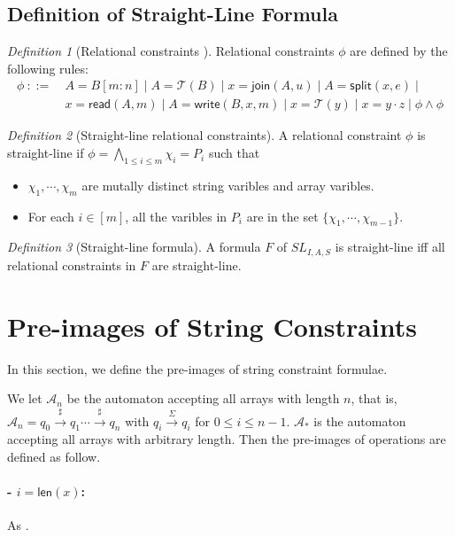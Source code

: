 \documentclass[12pt]{article}
\newcommand*{\aut}{\mathcal{A}}
\newcommand*{\transducer}{\mathcal{T}}
\newcommand{\arrseparator}{\sharp}
\newcommand{\mysplit}{\mathsf{split}}
\newcommand{\myjoin}{\mathsf{join}}
\newcommand{\mylen}{\mathsf{len}}
\newcommand{\myread}{\mathsf{read}}
\newcommand{\mywrite}{\mathsf{write}}
\newcommand{\arraylogic}{SL_{I,A,S}}
\theoremstyle{remark}
\newtheorem{definition}{Definition}[section]
\begin{document}
\subsection{Definition of Straight-Line Formula }
\begin{definition}[Relational constraints ]
    Relational constraints $\phi$ are defined by the following rules:
    \begin{align*}
        \phi \ ::= \  & A = B[m:n] \mid A = \transducer(B) \mid x=\myjoin(A,u) \mid A = \mysplit(x,e) \mid         \\
                      & x=\myread(A, m) \mid A = \mywrite(B, x ,m) \mid x = \transducer(y) \mid x=y\cdot z \mid \phi \wedge \phi 
    \end{align*}
\end{definition}
\begin{definition}[Straight-line relational constraints]
    A relational constraint $\phi$ is straight-line if $\phi = \bigwedge\limits_{1\leq i \leq m} \chi_i = P_i$ such that
    \begin{itemize}
        \item $\chi_1,\cdots,\chi_m $ are mutally distinct string varibles and array varibles.
        \item For each $i\in [m] $, all the varibles in $P_i$ are in the set $\{\chi_1,\cdots,\chi_{m-1} \}$.
    \end{itemize}
\end{definition}
\begin{definition}[Straight-line formula]
    A formula $F$ of $\arraylogic$ is straight-line iff all relational constraints in $F$ are straight-line.
\end{definition}

\section{Pre-images of String Constraints}\label{sec:pre_image}

In this section, we define the pre-images of string constraint formulae. 
\pagebreak

We let $\aut_{n}$ be the automaton accepting all arrays with length $n$, that is, $\aut_{n} = q_0\xrightarrow{\arrseparator}q_1\cdots\xrightarrow{\arrseparator}q_{n}$ with $q_i\xrightarrow{\Sigma}q_i$ for $0\leq i \leq n-1$. $\aut_*$ is the automaton accepting all arrays with arbitrary length. Then the pre-images of operations are defined as follow.

\paragraph{- $i = \mylen(x)$:} As \cite{atva2020}.
\end{document}
